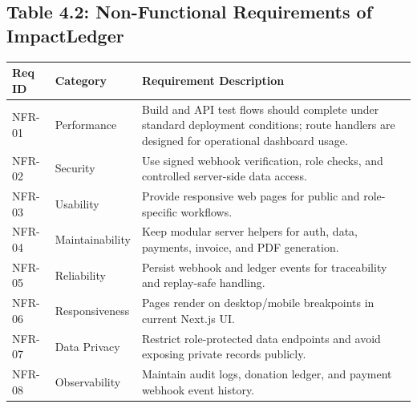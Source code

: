 \documentclass[12pt,a4paper]{article}
\begin{document}
\subsection{Table 4.2: Non-Functional Requirements of ImpactLedger}
\begin{longtable}{p{}p{}p{}}
	\toprule
	Req ID & Category        & Requirement Description                                                                                                                     \\
	\midrule
	NFR-01 & Performance     & Build and API test flows should complete under standard deployment conditions; route handlers are designed for operational dashboard usage. \\
	NFR-02 & Security        & Use signed webhook verification, role checks, and controlled server-side data access.                                                       \\
	NFR-03 & Usability       & Provide responsive web pages for public and role-specific workflows.                                                                        \\
	NFR-04 & Maintainability & Keep modular server helpers for auth, data, payments, invoice, and PDF generation.                                                          \\
	NFR-05 & Reliability     & Persist webhook and ledger events for traceability and replay-safe handling.                                                                \\
	NFR-06 & Responsiveness  & Pages render on desktop/mobile breakpoints in current Next.js UI.                                                                           \\
	NFR-07 & Data Privacy    & Restrict role-protected data endpoints and avoid exposing private records publicly.                                                         \\
	NFR-08 & Observability   & Maintain audit logs, donation ledger, and payment webhook event history.                                                                    \\
	\bottomrule
\end{longtable}
\end{document}
